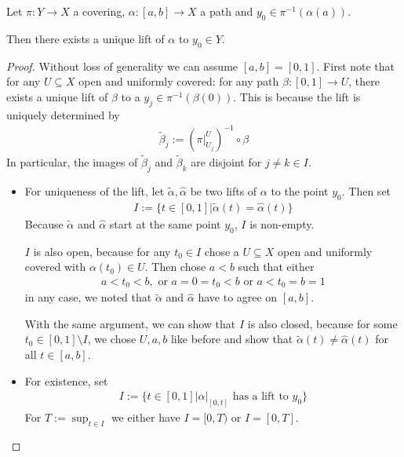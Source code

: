 \begin{lem}[]
  Let $\pi: Y \to X$ a covering, $\alpha:[a,b] \to X$ a path and $y_0 \in \pi^{-1}(\alpha(a))$.
  
  Then there exists a unique lift of $\alpha$ to $y_0 \in Y$.
\end{lem}
\begin{proof}
  Without loss of generality we can assume $[a,b] = [0,1]$.
  First note that for any $U \subseteq X$ open and uniformly covered: 
  for any path $\beta:[0,1] \to U$, there exists a unique lift of $\beta$ to a $y_j \in \pi^{-1}(\beta(0))$.
  This is because the lift is uniquely determined by
  \begin{align*}
    \tilde{\beta}_j := \left(
      \pi|_{U_j}^{U}
    \right)^{-1} \circ \beta
  \end{align*}
  In particular, the images of $\tilde{\beta}_j$ and $\tilde{\beta}_k$ are disjoint for $j \neq k \in I$.
  \begin{itemize}
    \item For uniqueness of the lift, let $\tilde{\alpha}, \hat{\alpha}$ be two lifts of $\alpha$ to the point $y_0$.
      Then set
      \begin{align*}
        I := \{t \in [0,1] \big\vert \tilde{\alpha}(t) = \hat{\alpha}(t)\}
      \end{align*}
      Because $\tilde{\alpha}$ and $\hat{\alpha}$ start at the same point $y_0$, $I$ is non-empty.

      $I$ is also open, because for any $t_0 \in I$ chose a $U \subseteq X$ open and uniformly covered with $\alpha(t_0) \in U$.
      Then chose $a < b$ such that either
      \begin{align*}
        a < t_0 < b, \text{ or } a = 0 = t_0 < b \text{ or } a < t_0 = b = 1
      \end{align*}
      in any case, we noted that $\tilde{\alpha}$ and $\hat{\alpha}$ have to agree on $[a,b]$. 

      With the same argument, we can show that $I$ is also closed, because for some $t_0 \in [0,1] \setminus I$, we chose $U,a,b$ like before and show that $\tilde{\alpha}(t) \neq \hat{\alpha}(t)$ for all $t \in [a,b]$.
    \item For existence, set
      \begin{align*}
        I := \{t \in [0,1] \big\vert \alpha|_{[0,t]} \text{ has a lift to $y_0$}\}
      \end{align*}
      For $T := \sup_{t \in I}$ we either have $I = [0,T)$ or $I=[0,T]$.


\end{itemize}
\end{proof}
